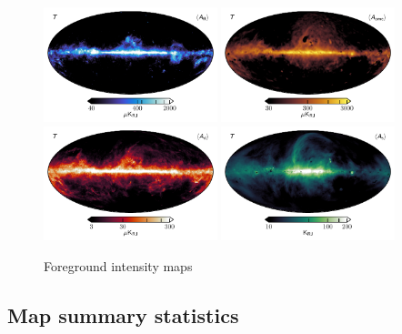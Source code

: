 \documentclass[twocolumn]{../../common/aa}
\begin{document}
\begin{figure}
	\centering
	\includegraphics[width=0.45\textwidth]{figures/ff_I.pdf}
	\includegraphics[width=0.45\textwidth]{figures/ame_I.pdf}\\
	\includegraphics[width=0.45\textwidth]{figures/dust_I.pdf}
	\includegraphics[width=0.45\textwidth]{figures/synch_I.pdf}\\
	\caption{Foreground intensity maps}
\end{figure}

\subsection{Map summary statistics}
\end{document}
